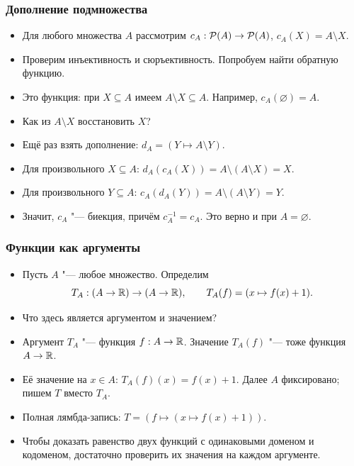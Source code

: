 \documentclass[10pt]{beamer}
\begin{document}
\begin{frame}
    \frametitle{Дополнение подмножества}
    \begin{itemize}
        \item Для любого множества $A$ рассмотрим $c_A:\mathcal{P}({A})\to\mathcal{P}({A})$, $c_A(X)=A\setminus X$.
        \item Проверим инъективность и сюръективность. Попробуем найти обратную функцию.
        \item<2-> Это функция: при $X\subseteq A$ имеем $A\setminus X\subseteq A$. Например, $c_A(\varnothing)=A$.
        \item<3-> Как из $A\setminus X$ восстановить $X$?
        \item<4-> Ещё раз взять дополнение: $d_A=(Y\mapsto A\setminus Y)$.
        \item<5-> Для произвольного $X\subseteq A$: $d_A(c_A(X))=A\setminus(A\setminus X)=X$.
        \item<6-> Для произвольного $Y\subseteq A$: $c_A(d_A(Y))=A\setminus(A\setminus Y)=Y$.
        \item<7-> Значит, $c_A$ "--- биекция, причём $c_A^{-1}=c_A$. Это верно и при $A=\varnothing$.
    \end{itemize}
\end{frame}

\begin{frame}
    \frametitle{Функции как аргументы}
    \begin{itemize}
        \item Пусть $A$ "--- любое множество. Определим
        \[T_A:(A\to\mathbb{R})\to(A\to\mathbb{R}),\qquad T_A(f)=(x\mapsto f(x)+1).\]
        \item Что здесь является аргументом и значением?
        \item<2-> Аргумент $T_A$ "--- функция $f:A\to\mathbb{R}$. Значение $T_A(f)$ "--- тоже функция $A\to\mathbb{R}$.
        \item<3-> Её значение на $x\in A$: $T_A(f)(x)=f(x)+1$. Далее $A$ фиксировано; пишем $T$ вместо $T_A$.
        \item<4-> Полная лямбда-запись: $T=(f\mapsto(x\mapsto f(x)+1))$.
        \item<5-> Чтобы доказать равенство двух функций с одинаковыми доменом и кодоменом, достаточно проверить их значения на каждом аргументе.
    \end{itemize}
\end{frame}
\end{document}
